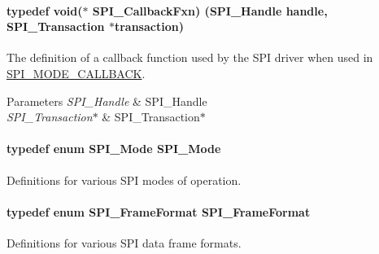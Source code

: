 \paragraph[{S\+P\+I\+\_\+\+Callback\+Fxn}]{\setlength{\rightskip}{0pt plus 5cm}typedef void($\ast$ S\+P\+I\+\_\+\+Callback\+Fxn) ({\bf S\+P\+I\+\_\+\+Handle} handle, {\bf S\+P\+I\+\_\+\+Transaction} $\ast$transaction)}\label{_s_p_i_8h_a207e2d5a7e7ea5606b6995b6485ca015}


The definition of a callback function used by the S\+P\+I driver when used in \hyperlink{_s_p_i_8h_ab9ea76c6529d6076eee5e1c4a5a92c6fa5631e69925c47a62a261c78ebbda39fb}{S\+P\+I\+\_\+\+M\+O\+D\+E\+\_\+\+C\+A\+L\+L\+B\+A\+C\+K}. 


\begin{DoxyParams}{Parameters}
{\em S\+P\+I\+\_\+\+Handle} & S\+P\+I\+\_\+\+Handle \\
\hline
{\em S\+P\+I\+\_\+\+Transaction$\ast$} & S\+P\+I\+\_\+\+Transaction$\ast$ \\
\hline
\end{DoxyParams}
\paragraph[{S\+P\+I\+\_\+\+Mode}]{\setlength{\rightskip}{0pt plus 5cm}typedef enum {\bf S\+P\+I\+\_\+\+Mode}  {\bf S\+P\+I\+\_\+\+Mode}}\label{_s_p_i_8h_aa336fc399a0b2b1b5442f8a1e169984f}


Definitions for various S\+P\+I modes of operation. 

\paragraph[{S\+P\+I\+\_\+\+Frame\+Format}]{\setlength{\rightskip}{0pt plus 5cm}typedef enum {\bf S\+P\+I\+\_\+\+Frame\+Format}  {\bf S\+P\+I\+\_\+\+Frame\+Format}}\label{_s_p_i_8h_a53949638d43ae7bf71b74c2b136ad206}


Definitions for various S\+P\+I data frame formats. 


